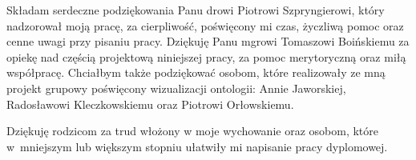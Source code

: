 \newpage
\vspace*{15 cm}

{
\it
\par
Składam serdeczne podziękowania Panu drowi Piotrowi Szpryngierowi, który nadzorował moją pracę,
 za cierpliwość, poświęcony mi czas, życzliwą pomoc 
oraz cenne uwagi przy pisaniu  pracy. Dziękuję Panu mgrowi Tomaszowi Boińskiemu za opiekę nad częścią 
projektową
niniejszej pracy, za pomoc merytoryczną oraz miłą współpracę. Chciałbym także podziękować osobom, 
które realizowały ze mną projekt grupowy poświęcony wizualizacji ontologii: Annie Jaworskiej, 
Radosławowi Kleczkowskiemu oraz Piotrowi Orłowskiemu. 
\par
Dziękuję rodzicom za trud włożony w moje wychowanie oraz osobom, 
które w~mniejszym lub większym stopniu ułatwiły mi napisanie pracy dyplomowej.


}